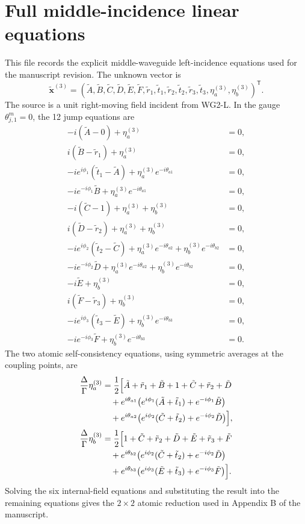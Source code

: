 \section*{Full middle-incidence linear equations}

This file records the explicit middle-waveguide left-incidence equations used for the manuscript revision.
The unknown vector is
\[
\tilde{\mathbf{x}}^{(3)}
= (\tilde A,\tilde B,\tilde C,\tilde D,\tilde E,\tilde F,
\tilde r_1,\tilde t_1,\tilde r_2,\tilde t_2,\tilde r_3,\tilde t_3,
\eta_a^{(3)},\eta_b^{(3)})^{\mathsf T}.
\]
The source is a unit right-moving field incident from WG2-L.
In the gauge \(\theta^m_{j,1}=0\), the 12 jump equations are
\begin{subequations}
\begin{align}
-i(\tilde A-0)+\eta_a^{(3)}&=0,\\
i(\tilde B-\tilde r_1)+\eta_a^{(3)}&=0,\\
-i e^{i\phi_1}(\tilde t_1-\tilde A)+\eta_a^{(3)}e^{-i\theta_{a1}}&=0,\\
-i e^{-i\phi_1}\tilde B+\eta_a^{(3)}e^{-i\theta_{a1}}&=0,\\
-i(\tilde C-1)+\eta_a^{(3)}+\eta_b^{(3)}&=0,\\
i(\tilde D-\tilde r_2)+\eta_a^{(3)}+\eta_b^{(3)}&=0,\\
-i e^{i\phi_2}(\tilde t_2-\tilde C)
+\eta_a^{(3)}e^{-i\theta_{a2}}
+\eta_b^{(3)}e^{-i\theta_{b2}}&=0,\\
-i e^{-i\phi_2}\tilde D
+\eta_a^{(3)}e^{-i\theta_{a2}}
+\eta_b^{(3)}e^{-i\theta_{b2}}&=0,\\
-i\tilde E+\eta_b^{(3)}&=0,\\
i(\tilde F-\tilde r_3)+\eta_b^{(3)}&=0,\\
-i e^{i\phi_3}(\tilde t_3-\tilde E)+\eta_b^{(3)}e^{-i\theta_{b3}}&=0,\\
-i e^{-i\phi_3}\tilde F+\eta_b^{(3)}e^{-i\theta_{b3}}&=0.
\end{align}
\end{subequations}
The two atomic self-consistency equations, using symmetric averages at the coupling points, are
\begin{align}
\frac{\Delta}{\Gamma}\eta_a^{(3)}
&= \frac{1}{2}\Bigl[
\tilde A+\tilde r_1+\tilde B
+1+\tilde C+\tilde r_2+\tilde D \nonumber\\
&\quad + e^{i\theta_{a1}}\bigl(e^{i\phi_1}(\tilde A+\tilde t_1)
+e^{-i\phi_1}\tilde B\bigr) \nonumber\\
&\quad + e^{i\theta_{a2}}\bigl(e^{i\phi_2}(\tilde C+\tilde t_2)
+e^{-i\phi_2}\tilde D\bigr)
\Bigr],\\
\frac{\Delta}{\Gamma}\eta_b^{(3)}
&= \frac{1}{2}\Bigl[
1+\tilde C+\tilde r_2+\tilde D
+\tilde E+\tilde r_3+\tilde F \nonumber\\
&\quad + e^{i\theta_{b2}}\bigl(e^{i\phi_2}(\tilde C+\tilde t_2)
+e^{-i\phi_2}\tilde D\bigr) \nonumber\\
&\quad + e^{i\theta_{b3}}\bigl(e^{i\phi_3}(\tilde E+\tilde t_3)
+e^{-i\phi_3}\tilde F\bigr)
\Bigr].
\end{align}
Solving the six internal-field equations and substituting the result into the remaining equations gives the \(2\times2\) atomic reduction used in Appendix B of the manuscript.
